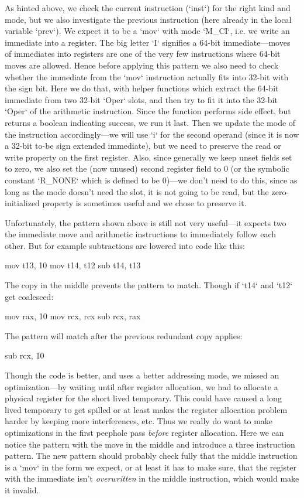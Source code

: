 As hinted above, we check the current instruction (`inst`) for the right kind
and mode, but we also investigate the previous instruction (here already in the
local variable `prev`). We expect it to be a `mov` with mode `M_CI`, i.e. we
write an immediate into a register. The big letter `I` signifies a 64-bit
immediate---moves of immediates into registers are one of the very few
instructions where 64-bit moves are allowed. Hence before applying this pattern
we also need to check whether the immediate from the `mov` instruction actually
fits into 32-bit with the sign bit. Here we do that, with helper functions which
extract the 64-bit immediate from two 32-bit `Oper` slots, and then try to fit
it into the 32-bit `Oper` of the arithmetic instruction. Since the function
performs side effect, but returns a boolean indicating success, we run it last.
Then we update the mode of the instruction accordingly---we will use `i` for the
second operand (since it is now a 32-bit to-be sign extended immediate), but we
need to preserve the read or write property on the first register. Also, since
generally we keep unset fields set to zero, we also set the (now unused) second
register field to 0 (or the symbolic constant `R_NONE` which is defined to be
0)---we don't need to do this, since as long as the mode doesn't need the slot,
it is not going to be read, but the zero-initialized property is sometimes
useful and we chose to preserve it.

Unfortunately, the pattern shown above is still not very useful---it expects two
the immediate move and arithmetic instructions to immediately follow each other.
But for example subtractions are lowered into code like this:

\begtt
mov t13, 10
mov t14, t12
sub t14, t13
\endtt

The copy in the middle prevents the pattern to match. Though if `t14` and `t12`
get coalesced:

\begtt
mov rax, 10
mov rcx, rcx
sub rcx, rax
\endtt

The pattern will match after the previous redundant copy applies:

\begtt
sub rcx, 10
\endtt

Though the code is better, and uses a better addressing mode, we missed an
optimization---by waiting until after register allocation, we had to allocate
a physical register for the short lived temporary. This could have caused a long
lived temporary to get spilled or at least makes the register allocation problem
harder by keeping more interferences, etc. Thus we really do want to make
optimizations in the first peephole pass {\em before} register allocation. Here
we can notice the pattern with the move in the middle and introduce a three
instruction pattern. The new pattern should probably check fully that the middle
instruction is a `mov` in the form we expect, or at least it has to make sure,
that the register with the immediate isn't {\em overwritten} in the middle
instruction, which would make it invalid.



